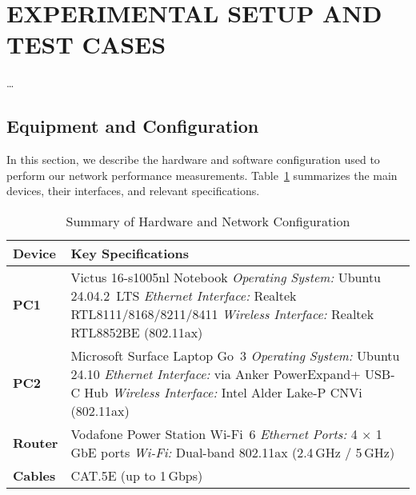 
\section{EXPERIMENTAL SETUP AND TEST CASES} \label{sec:experimental-setup-and-test-cases}


    \ldots

    \subsection{Equipment and Configuration} \label{subsec:equipment-and-configuration}

        In this section, we describe the hardware and software configuration used to perform our network performance measurements. Table~\ref{tab:equipment-summary} summarizes the main devices, their interfaces, and relevant specifications. 

        \begin{table}[ht]
            \small
            \centering
            \caption{Summary of Hardware and Network Configuration}
            \label{tab:equipment-summary}
            \begin{tabular}{@{}l p{}@{}}
            \toprule
            \textbf{Device} & \textbf{Key Specifications} \\
            \midrule
            \textbf{PC1} 
                & Victus 16-s1005nl Notebook \newline
                  \textit{Operating System:} Ubuntu 24.04.2~LTS \newline
                  \textit{Ethernet Interface:} Realtek RTL8111/8168/8211/8411 \newline
                  \textit{Wireless Interface:} Realtek RTL8852BE (802.11ax) \\
            \midrule
            \textbf{PC2} 
                & Microsoft Surface Laptop Go~3 \newline
                  \textit{Operating System:} Ubuntu 24.10 \newline
                  \textit{Ethernet Interface:} via Anker PowerExpand+ USB-C Hub \newline
                  \textit{Wireless Interface:} Intel Alder Lake-P CNVi (802.11ax) \\
            \midrule
            \textbf{Router} 
                & Vodafone Power Station Wi-Fi~6 \newline
                  \textit{Ethernet Ports:} 4 $\times$ 1\,GbE ports \newline
                  \textit{Wi-Fi:} Dual-band 802.11ax (2.4\,GHz / 5\,GHz) \\
            \midrule
            \textbf{Cables} 
                & CAT.5E (up to 1\,Gbps) \\
            \bottomrule
            \end{tabular}
        \end{table}

